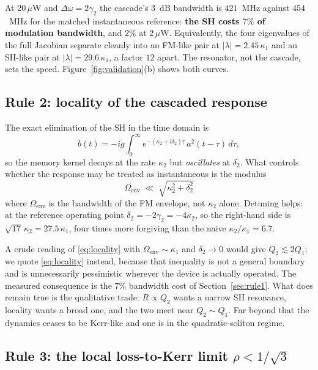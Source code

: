 \documentclass[11pt,a4paper]{article}
\newcommand{\Dom}{\Delta\omega}
\begin{document}
At $20\,\mu$W and $\Dom=2\gamma_2$ the cascade's $3$~dB bandwidth is
$421$~MHz against $454$~MHz for the matched instantaneous reference:
\textbf{the SH costs $7\%$ of modulation bandwidth}, and $2\%$ at
$2\,\mu$W.  Equivalently, the four eigenvalues of the full Jacobian
separate cleanly into an FM-like pair at $|\lambda|=2.45\,\kappa_1$ and
an SH-like pair at $|\lambda|=29.6\,\kappa_1$, a factor $12$ apart.
The resonator, not the cascade, sets the speed.
Figure~\ref{fig:validation}(b) shows both curves.

\subsection{Rule 2: locality of the cascaded response}\label{sec:rule2}

The exact elimination of the SH in the time domain is
\begin{equation}
  b(t)=-ig\!\int_0^\infty\! e^{-(\kappa_2+i\delta_2)\tau}\,a^2(t-\tau)\,d\tau ,
  \label{eq:bmemory}
\end{equation}
so the memory kernel decays at the rate $\kappa_2$ but \emph{oscillates}
at $\delta_2$.  What controls whether the response may be treated as
instantaneous is the modulus
\begin{equation}
  \boxed{\;\Omega_{\text{env}}\;\ll\;\sqrt{\kappa_2^{2}+\delta_2^{2}}\;}
  \label{eq:locality}
\end{equation}
where $\Omega_{\text{env}}$ is the bandwidth of the FM envelope, not
$\kappa_2$ alone.  Detuning helps: at the reference operating point
$\delta_2=-2\gamma_2=-4\kappa_2$, so the right-hand side is
$\sqrt{17}\,\kappa_2=27.5\,\kappa_1$, four times more forgiving than the
naive $\kappa_2/\kappa_1=6.7$.

A crude reading of \eqref{eq:locality} with
$\Omega_{\text{env}}\sim\kappa_1$ and $\delta_2\to0$ would give
$Q_2\lesssim2Q_1$; we quote \eqref{eq:locality} instead, because that
inequality is not a general boundary and is unnecessarily pessimistic
wherever the device is actually operated.  The measured consequence is
the $7\%$ bandwidth cost of Section~\ref{sec:rule1}.  What does remain
true is the qualitative trade: $R\propto Q_2$ wants a narrow SH
resonance, locality wants a broad one, and the two meet near
$Q_2\sim Q_1$.  Far beyond that the dynamics ceases to be Kerr-like and
one is in the quadratic-soliton regime.

\subsection{Rule 3: the local loss-to-Kerr limit
\texorpdfstring{$\rho<1/\sqrt3$}{rho < 1/sqrt3}}\label{sec:rule3}
\end{document}
